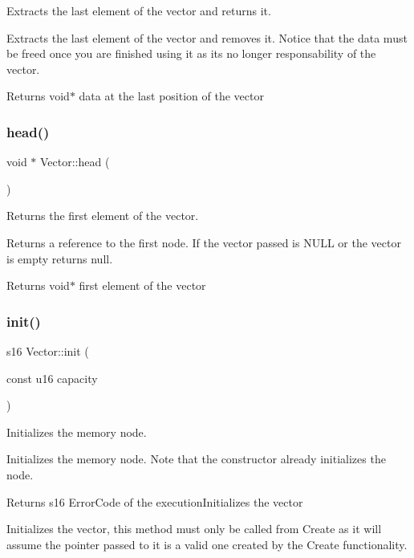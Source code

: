 Extracts the last element of the vector and returns it. 

Extracts the last element of the vector and removes it. Notice that the data must be freed once you are finished using it as it\textquotesingle{}s no longer responsability of the vector.

\begin{DoxyReturn}{Returns}
void$\ast$ data at the last position of the vector 
\end{DoxyReturn}
\mbox{\label{class_vector_ab8f205d5a5da8672d6aa048b773a852f}} 
\subsubsection{\texorpdfstring{head()}{head()}}
{\footnotesize\ttfamily void $\ast$ Vector\+::head (\begin{DoxyParamCaption}{ }\end{DoxyParamCaption})}



Returns the first element of the vector. 

Returns a reference to the first node. If the vector passed is N\+U\+LL or the vector is empty returns null.

\begin{DoxyReturn}{Returns}
void$\ast$ first element of the vector 
\end{DoxyReturn}
\mbox{\label{class_vector_a9b081b05b56862b5d5918beabe732c54}} 
\subsubsection{\texorpdfstring{init()}{init()}}
{\footnotesize\ttfamily s16 Vector\+::init (\begin{DoxyParamCaption}\item[{const u16}]{capacity }\end{DoxyParamCaption})}



Initializes the memory node. 

Initializes the memory node. Note that the constructor already initializes the node.

\begin{DoxyReturn}{Returns}
s16 Error\+Code of the execution\+Initializes the vector
\end{DoxyReturn}
Initializes the vector, this method must only be called from Create as it will assume the pointer passed to it is a valid one created by the Create functionality.

